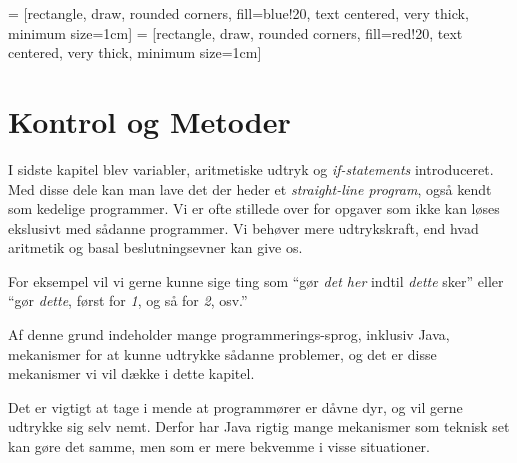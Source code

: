 

\usetikzlibrary{shapes,arrows,graphs}

  = [rectangle, draw, rounded corners, fill=blue!20, text centered, very thick, minimum size=1cm]
 = [rectangle, draw, rounded corners, fill=red!20,  text centered, very thick, minimum size=1cm]


\chapter{Kontrol og Metoder}






    I sidste kapitel blev variabler, aritmetiske udtryk og
    \emph{if-statements} introduceret. Med disse dele kan man lave det
    der heder et \emph{straight-line program}, også kendt som kedelige
    programmer. Vi er ofte stillede over for opgaver som ikke kan
    løses ekslusivt med sådanne programmer. Vi behøver mere
    udtrykskraft, end hvad aritmetik og basal beslutningsevner kan
    give os.

    For eksempel vil vi gerne kunne sige ting som ``gør \emph{det her} indtil
	\emph{dette} sker'' eller ``gør \emph{dette}, først for \emph{1}, og så for
	\emph{2}, osv.''

	Af denne grund indeholder mange programmerings-sprog, inklusiv Java,
	mekanismer for at kunne udtrykke sådanne problemer, og det er disse
	mekanismer vi vil dække i dette kapitel.

	Det er vigtigt at tage i mende at programmører er dåvne dyr, og vil gerne
	udtrykke sig selv nemt. Derfor har Java rigtig mange mekanismer som teknisk
	set kan gøre det samme, men som er mere bekvemme i visse situationer.

